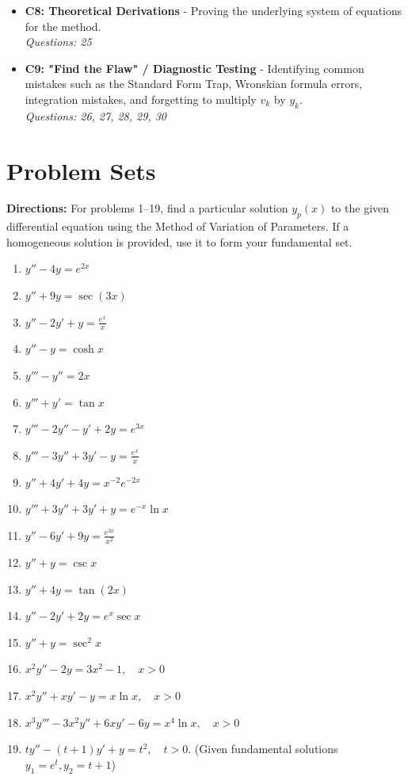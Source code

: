 \documentclass[11pt]{article}
\begin{document}
\begin{itemize}
    \item \textbf{C8: Theoretical Derivations} - Proving the underlying system of equations for the method. \\
    \textit{Questions: 25}
    
    \item \textbf{C9: "Find the Flaw" / Diagnostic Testing} - Identifying common mistakes such as the Standard Form Trap, Wronskian formula errors, integration mistakes, and forgetting to multiply $v_k$ by $y_k$. \\
    \textit{Questions: 26, 27, 28, 29, 30}
\end{itemize}

\newpage

\section{Problem Sets}

\textbf{Directions:} For problems 1--19, find a particular solution $y_p(x)$ to the given differential equation using the Method of Variation of Parameters. If a homogeneous solution is provided, use it to form your fundamental set.

\begin{enumerate}
    \item $y'' - 4y = e^{2x}$
    \item $y'' + 9y = \sec(3x)$
    \item $y'' - 2y' + y = \frac{e^x}{x}$
    \item $y'' - y = \cosh x$
    \item $y''' - y'' = 2x$
    \item $y''' + y' = \tan x$
    \item $y''' - 2y'' - y' + 2y = e^{3x}$
    \item $y''' - 3y'' + 3y' - y = \frac{e^x}{x}$
    \item $y'' + 4y' + 4y = x^{-2}e^{-2x}$
    \item $y''' + 3y'' + 3y' + y = e^{-x} \ln x$
    \item $y'' - 6y' + 9y = \frac{e^{3x}}{x^2}$
    \item $y'' + y = \csc x$
    \item $y'' + 4y = \tan(2x)$
    \item $y'' - 2y' + 2y = e^x \sec x$
    \item $y'' + y = \sec^2 x$
    \item $x^2 y'' - 2y = 3x^2 - 1, \quad x > 0$
    \item $x^2 y'' + xy' - y = x \ln x, \quad x > 0$
    \item $x^3 y''' - 3x^2 y'' + 6x y' - 6y = x^4 \ln x, \quad x > 0$
    \item $t y'' - (t+1)y' + y = t^2, \quad t > 0$. (Given fundamental solutions $y_1 = e^t, y_2 = t+1$)
\end{enumerate}
\end{document}
